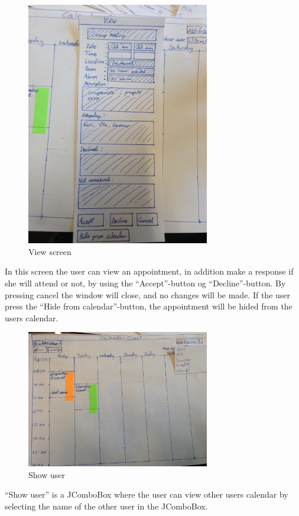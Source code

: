 \documentclass{article}
\begin{document}
\newpage

\begin{figure}[h!] 
    \begin{center} 
        \includegraphics[width=8cm]{img/IMG_5609.JPG}
        \caption{View screen}
    \label{view}
    \end{center}
\end{figure}
In this screen the user can view an appointment, in addition make a response if she will attend or not, by using the ``Accept''-button og ``Decline''-button. By pressing cancel the window will close, and no changes will be made. If the user press the ``Hide from calendar''-button, the appointment will be hided from the users calendar.

\newpage

\begin{figure}[h!] 
    \begin{center} 
        \includegraphics[width=8cm]{img/IMG_5610.JPG}
        \caption{Show user}
    \label{showuser}
    \end{center}
\end{figure}
``Show user'' is a JComboBox where the user can view other users calendar by selecting the name of the other user in the JComboBox.
\end{document}
